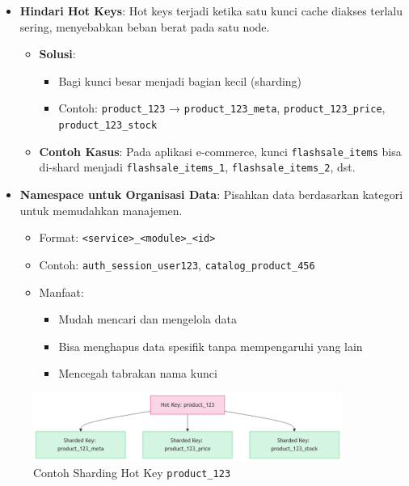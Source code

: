 \documentclass[11pt, a4paper]{book}
\begin{document}
	\begin{itemize}
		\item \textbf{Hindari Hot Keys}:  
		Hot keys terjadi ketika satu kunci cache diakses terlalu sering, menyebabkan beban berat pada satu node.
		\begin{itemize}
			\item \textbf{Solusi}:  
			\begin{itemize}
				\item Bagi kunci besar menjadi bagian kecil (sharding)
				\item Contoh:  
				\texttt{product\_123} → \texttt{product\_123\_meta}, \texttt{product\_123\_price}, \texttt{product\_123\_stock}
			\end{itemize}
			
			\item \textbf{Contoh Kasus}:  
			Pada aplikasi e-commerce, kunci \texttt{flashsale\_items} bisa di-shard menjadi \texttt{flashsale\_items\_1}, \texttt{flashsale\_items\_2}, dst.
		\end{itemize}
		
		\item \textbf{Namespace untuk Organisasi Data}:  
		Pisahkan data berdasarkan kategori untuk memudahkan manajemen.
		\begin{itemize}
			\item Format: \texttt{<service>\_<module>\_<id>}
			\item Contoh:  
			\texttt{auth\_session\_user123}, \texttt{catalog\_product\_456}
			\item Manfaat: 
			\begin{itemize}
				\item Mudah mencari dan mengelola data
				\item Bisa menghapus data spesifik tanpa mempengaruhi yang lain
				\item Mencegah tabrakan nama kunci
			\end{itemize}
		\end{itemize}
	\end{itemize}
	
	\begin{figure}[H]
		\centering
		\includegraphics[width=0.9\textwidth]{images/sharding-hotkey.png}
		\caption{Contoh Sharding Hot Key \texttt{product\_123}}
		\label{fig:sharding-hotkey}
	\end{figure}
	
\end{document}
